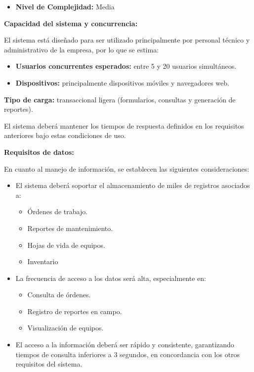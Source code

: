 \documentclass[12pt,a4paper]{article}
\begin{document}
\begin{itemize}
  \item \textbf{Nivel de Complejidad:} Media
\end{itemize}

\textbf{Capacidad del sistema y concurrencia:}

El sistema está diseñado para ser utilizado principalmente por personal técnico y administrativo de la empresa, por lo que se estima:

\begin{itemize}
  \item \textbf{Usuarios concurrentes esperados:} entre 5 y 20 usuarios simultáneos.

  \item \textbf{Dispositivos:} principalmente dispositivos móviles y navegadores web.
\end{itemize}

\textbf{Tipo de carga:} transaccional ligera (formularios, consultas y generación de reportes).

El sistema deberá mantener los tiempos de respuesta definidos en los requisitos anteriores bajo estas condiciones de uso.

\textbf{Requisitos de datos:}

En cuanto al manejo de información, se establecen las siguientes consideraciones:

\begin{itemize}
  \item El sistema deberá soportar el almacenamiento de miles de registros asociados a:
  \begin{itemize}
    \item Órdenes de trabajo.
    \item Reportes de mantenimiento.
    \item Hojas de vida de equipos.
    \item Inventario
  \end{itemize}

  \item La frecuencia de acceso a los datos será alta, especialmente en:
  \begin{itemize}
    \item Consulta de órdenes.
    \item Registro de reportes en campo.
    \item Visualización de equipos.
  \end{itemize}

  \item El acceso a la información deberá ser rápido y consistente, garantizando tiempos de consulta inferiores a 3 segundos, en concordancia con los otros requisitos del sistema.
\end{itemize}
\end{document}
